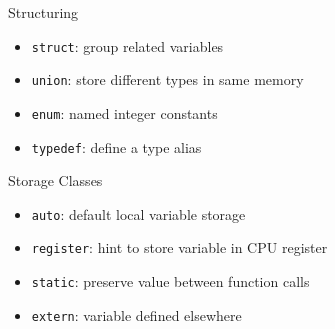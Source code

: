 \documentclass[12pt, aspectratio=169]{beamer}
\begin{document}
    \begin{frame}{Structuring}
        \begin{itemize}
            \item \texttt{struct}: group related variables
            \item \texttt{union}: store different types in same memory
            \item \texttt{enum}: named integer constants
            \item \texttt{typedef}: define a type alias
        \end{itemize}
    \end{frame}




    \begin{frame}{Storage Classes}
        \begin{itemize}
            \item \texttt{auto}: default local variable storage
            \item \texttt{register}: hint to store variable in CPU register
            \item \texttt{static}: preserve value between function calls
            \item \texttt{extern}: variable defined elsewhere
        \end{itemize}
    \end{frame}
\end{document}
